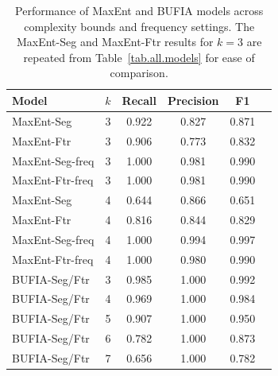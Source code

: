 \begin{table}[t]
\setlength{\tabcolsep}{3pt}
\begin{tabular}{lccccc}
\toprule
Model             & $k$ & Recall & Precision & F1    \\
\midrule
MaxEnt-Seg 		& 3 & 0.922  & 0.827     & 0.871 \\
MaxEnt-Ftr  & 3&0.906  & 0.773     & 0.832 \\
MaxEnt-Seg-freq   & 3   & 1.000  & 0.981     & 0.990 \\
MaxEnt-Ftr-freq   & 3   & 1.000  & 0.981     & 0.990 \\
MaxEnt-Seg        & 4   & 0.644  & 0.866     & 0.651 \\
MaxEnt-Ftr        & 4   & 0.816  & 0.844     & 0.829 \\
MaxEnt-Seg-freq   & 4   & 1.000  & 0.994     & 0.997 \\
MaxEnt-Ftr-freq   & 4   & 1.000  & 0.980     & 0.990 \\
\midrule
BUFIA-Seg/Ftr     & 3   & 0.985  & 1.000     & 0.992 \\
BUFIA-Seg/Ftr     & 4   & 0.969  & 1.000     & 0.984 \\
BUFIA-Seg/Ftr     & 5   & 0.907  & 1.000     & 0.950 \\
BUFIA-Seg/Ftr     & 6   & 0.782  & 1.000     & 0.873 \\
BUFIA-Seg/Ftr     & 7   & 0.656  & 1.000     & 0.782 \\
\bottomrule
\end{tabular}
\caption{Performance of MaxEnt and BUFIA models across complexity bounds and frequency settings. The MaxEnt-Seg and MaxEnt-Ftr results for \(k = 3\) are repeated from Table~\ref{tab.all.models} for ease of comparison.}
\label{tab.results2}
\end{table}